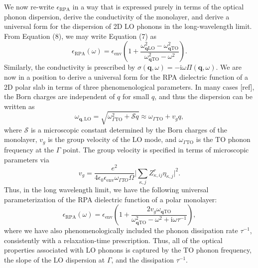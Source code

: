 \documentclass[aps,prb,twocolumn,
	groupedaddress,superscriptaddress,
	amsfonts,amssymb,amsmath,floatfix,
	citeautoscript]{revtex4-1}
\newcommand{\iu}{\mathrm{i}}
\begin{document}
We now re-write $\epsilon_{\mathrm{RPA}}$ in a way that is expressed purely in terms of the optical phonon dispersion, derive the conductivity of the monolayer, and derive a universal form for the dispersion of 2D LO phonons in the long-wavelength limit. From Equation (8), we may write Equation (7) as
\begin{equation}
\epsilon_{\mathrm{RPA}}(\omega) = \epsilon_{\mathrm{env}}\left( 1 + \frac{\omega^2_{\mathbf{q}\mathrm{LO}}-\omega^2_{\mathbf{q}\mathrm{TO}}}{\omega^2_{\mathbf{q}\mathrm{TO}}-\omega^2}\right).
\end{equation}
Similarly, the conductivity is prescribed by $\sigma(\mathbf{q},\omega) = -\iu \omega \Pi(\mathbf{q},\omega)$. We are now in a position to derive a universal form for the RPA dielectric function of a 2D polar slab in terms of three phenomenological parameters. In many cases [ref], the Born charges are independent of $q$ for small $q$, and thus the dispersion can be written as
\begin{equation}
\omega_{\mathbf{q},\mathrm{LO}} = \sqrt{\omega^2_{\Gamma \mathrm{TO}}+\mathcal{S}q} \approx \omega_{\Gamma \mathrm{TO}} + v_g q,
\end{equation}
where $\mathcal{S}$ is a microscopic constant determined by the Born charges of the monolayer, $v_g$ is the group velocity of the LO mode, and $\omega_{\Gamma \mathrm{TO}}$ is the TO phonon frequency at the $\Gamma$ point. The group velocity is specified in terms of microscopic parameters via 
\begin{equation}
v_g = \frac{e^2 }{4\epsilon_0 \epsilon_{\mathrm{env}}\omega_{\Gamma TO}\Omega}\Big|\sum\limits_{\kappa,j}Z^r_{\kappa,ij}\eta_{\kappa,j}  \Big|^2. 
\end{equation}
Thus, in the long wavelength limit, we have the following universal parameterization of the RPA dielectric function of a polar monolayer:
\begin{equation}
\epsilon_{\mathrm{RPA}}(\omega) = \epsilon_{\mathrm{env}}\left( 1 + \frac{2v_g\omega_{\mathbf{q}\mathrm{TO}}}{\omega^2_{\mathbf{q}\mathrm{TO}}-\omega^2+\iu \omega \tau^{-1}}\right),
\end{equation}
where we have also phenomenologically included the phonon dissipation rate $\tau^{-1}$, consistently with  a relaxation-time prescription. Thus, all of the optical properties associated with LO phonons is captured by the TO phonon frequency, the slope of the LO dispersion at $\Gamma$, and the dissipation $\tau^{-1}$.
\end{document}
